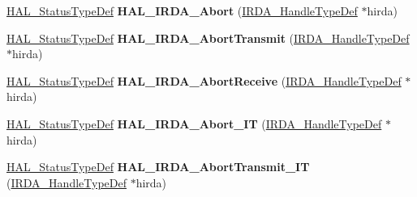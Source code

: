 \begin{DoxyCompactItemize}
\item 
\mbox{\label{group___i_r_d_a___exported___functions___group2_gaf2f9d82c14bb1848630fdd1623499c79}} 
\hyperlink{stm32f0xx__hal__def_8h_a63c0679d1cb8b8c684fbb0632743478f}{H\+A\+L\+\_\+\+Status\+Type\+Def} {\bfseries H\+A\+L\+\_\+\+I\+R\+D\+A\+\_\+\+Abort} (\hyperlink{struct_i_r_d_a___handle_type_def}{I\+R\+D\+A\+\_\+\+Handle\+Type\+Def} $\ast$hirda)
\item 
\mbox{\label{group___i_r_d_a___exported___functions___group2_gaa44f3a6d6357a0ac511b85dd25354865}} 
\hyperlink{stm32f0xx__hal__def_8h_a63c0679d1cb8b8c684fbb0632743478f}{H\+A\+L\+\_\+\+Status\+Type\+Def} {\bfseries H\+A\+L\+\_\+\+I\+R\+D\+A\+\_\+\+Abort\+Transmit} (\hyperlink{struct_i_r_d_a___handle_type_def}{I\+R\+D\+A\+\_\+\+Handle\+Type\+Def} $\ast$hirda)
\item 
\mbox{\label{group___i_r_d_a___exported___functions___group2_gac96cea3a6754a6039e30b053d08449e6}} 
\hyperlink{stm32f0xx__hal__def_8h_a63c0679d1cb8b8c684fbb0632743478f}{H\+A\+L\+\_\+\+Status\+Type\+Def} {\bfseries H\+A\+L\+\_\+\+I\+R\+D\+A\+\_\+\+Abort\+Receive} (\hyperlink{struct_i_r_d_a___handle_type_def}{I\+R\+D\+A\+\_\+\+Handle\+Type\+Def} $\ast$hirda)
\item 
\mbox{\label{group___i_r_d_a___exported___functions___group2_gafa45460f7a1203081613f7d4e6dfe290}} 
\hyperlink{stm32f0xx__hal__def_8h_a63c0679d1cb8b8c684fbb0632743478f}{H\+A\+L\+\_\+\+Status\+Type\+Def} {\bfseries H\+A\+L\+\_\+\+I\+R\+D\+A\+\_\+\+Abort\+\_\+\+IT} (\hyperlink{struct_i_r_d_a___handle_type_def}{I\+R\+D\+A\+\_\+\+Handle\+Type\+Def} $\ast$hirda)
\item 
\mbox{\label{group___i_r_d_a___exported___functions___group2_ga5ba8d904bf67f01605ef53577a6179c9}} 
\hyperlink{stm32f0xx__hal__def_8h_a63c0679d1cb8b8c684fbb0632743478f}{H\+A\+L\+\_\+\+Status\+Type\+Def} {\bfseries H\+A\+L\+\_\+\+I\+R\+D\+A\+\_\+\+Abort\+Transmit\+\_\+\+IT} (\hyperlink{struct_i_r_d_a___handle_type_def}{I\+R\+D\+A\+\_\+\+Handle\+Type\+Def} $\ast$hirda)
\item 
\mbox{\label{group___i_r_d_a___exported___functions___group2_ga85640c0c77e0d065c33a607c86c67af4}} 

\end{DoxyCompactItemize}
